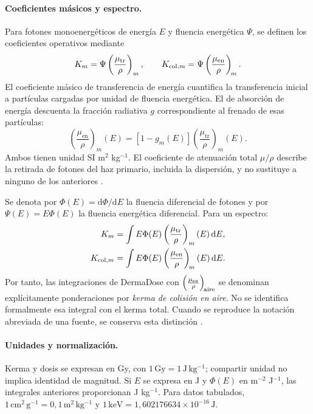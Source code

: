 \paragraph{Coeficientes másicos y espectro.}
Para fotones monoenergéticos de energía $E$ y fluencia energética $\Psi$, se definen los coeficientes operativos mediante
\begin{equation}
K_m=\Psi\left(\frac{\mu_{\mathrm{tr}}}{\rho}\right)_m,
\qquad K_{\mathrm{col},m}=\Psi\left(\frac{\mu_{\mathrm{en}}}{\rho}\right)_{\!m}.
\end{equation}
El coeficiente másico de transferencia de energía cuantifica la transferencia inicial a partículas cargadas por unidad de fluencia energética. El de absorción de energía descuenta la fracción radiativa $g$ correspondiente al frenado de esas partículas:
\begin{equation}
\left(\frac{\mu_{\mathrm{en}}}{\rho}\right)_m(E)
=[1-g_m(E)]\left(\frac{\mu_{\mathrm{tr}}}{\rho}\right)_m(E).
\end{equation}
Ambos tienen unidad SI m$^2$ kg$^{-1}$. El coeficiente de atenuación total $\mu/\rho$ describe la retirada de fotones del haz primario, incluida la dispersión, y no sustituye a ninguno de los anteriores \citep{nist}.

Se denota por $\Phi(E)=\mathrm d\Phi/\mathrm dE$ la fluencia diferencial de fotones y por $\Psi(E)=E\Phi(E)$ la fluencia energética diferencial. Para un espectro:
\begin{align}
K_m &= \int E\Phi(E)\left(\frac{\mu_{\mathrm{tr}}}{\rho}\right)_m(E)\,\mathrm dE,\\
K_{\mathrm{col},m} &= \int E\Phi(E)\left(\frac{\mu_{\mathrm{en}}}{\rho}\right)_{\!m}(E)\,\mathrm dE.
\end{align}
Por tanto, las integraciones de DermaDose con $\left(\frac{\mu_{\mathrm{en}}}{\rho}\right)_{\!\mathrm{aire}}$ se denominan explícitamente ponderaciones por \emph{kerma de colisión en aire}. No se identifica formalmente esa integral con el kerma total. Cuando se reproduce la notación abreviada de una fuente, se conserva esta distinción \citep{benreport,nist}.

\paragraph{Unidades y normalización.}
Kerma y dosis se expresan en Gy, con $1\,\mathrm{Gy}=1\,\mathrm{J\,kg^{-1}}$; compartir unidad no implica identidad de magnitud. Si $E$ se expresa en J y $\Phi(E)$ en m$^{-2}$ J$^{-1}$, las integrales anteriores proporcionan J kg$^{-1}$. Para datos tabulados, $1\,\mathrm{cm^2\,g^{-1}}=0{,}1\,\mathrm{m^2\,kg^{-1}}$ y $1\,\mathrm{keV}=1{,}602176634\times10^{-16}\,\mathrm J$.

